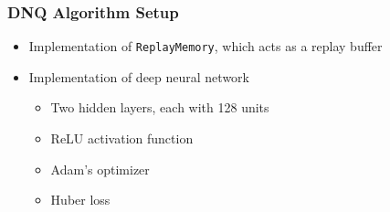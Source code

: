 \documentclass{beamer}
\begin{document}
\begin{frame}
    \frametitle{DNQ Algorithm Setup}

    \begin{itemize}
        \item Implementation of \texttt{ReplayMemory}, which acts as a replay buffer \pause
        \item Implementation of deep neural network \pause
              \begin{itemize}
                  \item Two hidden layers, each with 128 units
                  \item ReLU activation function
                  \item Adam's optimizer
                  \item Huber loss
              \end{itemize}
    \end{itemize}

\end{frame}
\end{document}
